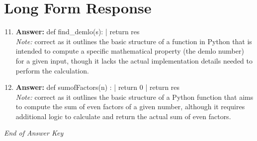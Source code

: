 \documentclass[12pt]{article}
\begin{document}
\section*{Long Form Response}
\begin{enumerate}[label=\arabic*.]
\setcounter{enumi}{10}
\item \textbf{Answer:} def find\_demlo(s): | return res
\\ \textit{Note:} correct as it outlines the basic structure of a function in Python that is intended to compute a specific mathematical property (the demlo number) for a given input, though it lacks the actual implementation details needed to perform the calculation.
\item \textbf{Answer:} def sumofFactors(n) : | return 0 | return res
\\ \textit{Note:} correct as it outlines the basic structure of a Python function that aims to compute the sum of even factors of a given number, although it requires additional logic to calculate and return the actual sum of even factors.
\end{enumerate}

\vfill
\noindent\textit{End of Answer Key}
\end{document}
